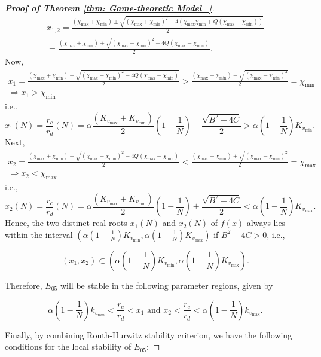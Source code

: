 \documentclass{article}
\theoremstyle{remark}
\theoremstyle{custom} %
\begin{document}
\begin{proof}[\textbf{Proof of Theorem \ref{thm: Game-theoretic Model_}}]
$$
\begin{gathered}
x_{1,2}=\frac{\left(\chi_{\max }+\chi_{\min }\right) \pm \sqrt{\left(\chi_{\max }+\chi_{\min }\right)^2-4\left(\chi_{\max } \chi_{\min }+Q\left(\chi_{\max }-\chi_{\min }\right)\right)}}{2} \\
=\frac{\left(\chi_{\max }+\chi_{\min }\right) \pm \sqrt{\left(\chi_{\max }-\chi_{\min }\right)^2-4 Q\left(\chi_{\max }-\chi_{\min }\right)}}{2}.
\end{gathered}
$$
Now,
$$
\begin{gathered}
x_1=\frac{\left(\chi_{\max }+\chi_{\min }\right)-\sqrt{\left(\chi_{\max }-\chi_{\min }\right)^2-4 Q\left(\chi_{\max }-\chi_{\min }\right)}}{2}>\frac{\left(\chi_{\max }+\chi_{\min }\right)-\sqrt{\left(\chi_{\max }-\chi_{\min }\right)^2}}{2}=\chi_{\min } \\
\Rightarrow x_1>\chi_{\min }
\end{gathered}
$$
i.e.,
$$
x_1(N)=\frac{r_c}{r_d}(N)=\alpha \frac{\left(K_{v_{\max }}+K_{v_{\min }}\right)}{2}\left(1-\frac{1}{N}\right)-\frac{\sqrt{B^2-4 C}}{2}>\alpha\left(1-\frac{1}{N}\right) K_{v_{\min }}.
$$
Next,
$$
\begin{gathered}
x_2=\frac{\left(\chi_{\max }+\chi_{\min }\right)+\sqrt{\left(\chi_{\max }-\chi_{\min }\right)^2-4 Q\left(\chi_{\max }-\chi_{\min }\right)}}{2}<\frac{\left(\chi_{\max }+\chi_{\min }\right)+\sqrt{\left(\chi_{\max }-\chi_{\min }\right)^2}}{2}=\chi_{\max } \\
\Rightarrow x_2<\chi_{\max }
\end{gathered}
$$
i.e.,
$$
x_2(N)=\frac{r_c}{r_d}(N)=\alpha \frac{\left(K_{v_{\max }}+K_{v_{\min }}\right)}{2}\left(1-\frac{1}{N}\right)+\frac{\sqrt{B^2-4 C}}{2}<\alpha\left(1-\frac{1}{N}\right) K_{v_{\max }} .
$$
Hence, the two distinct real roots $x_1(N)$ and $x_2(N)$ of $f(x)$ always lies within the interval $\left(\alpha\left(1-\frac{1}{N}\right) K_{v_{\min }}, \alpha\left(1-\frac{1}{N}\right) K_{v_{\max }}\right)$ if $B^2-4 C>0$, i.e.,

$$
\left(x_1, x_2\right) \subset\left(\alpha\left(1-\frac{1}{N}\right) K_{v_{\min }}, \alpha\left(1-\frac{1}{N}\right) K_{v_{\max }}\right) .
$$


Therefore, $E_{05}$ will be stable in the following parameter regions, given by

$$
\alpha\left(1-\frac{1}{N}\right) k_{v_{\min }}<\frac{r_c}{r_d}<x_1 \text { and } x_2<\frac{r_c}{r_d}<\alpha\left(1-\frac{1}{N}\right) k_{v_{\max }} .
$$


Finally, by combining Routh-Hurwitz stability criterion, we have the following conditions for the local stability of $E_{05}$: 


\end{proof}
\end{document}

